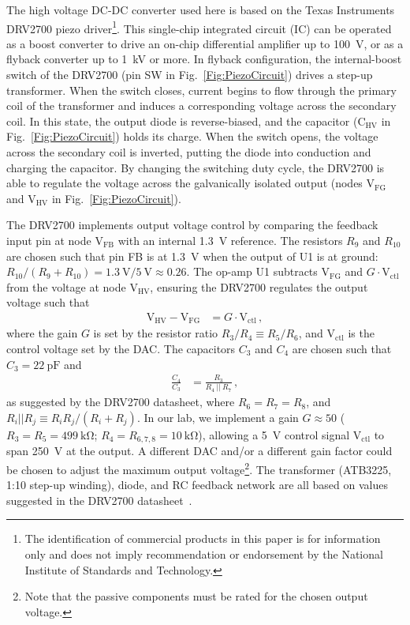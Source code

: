 \documentclass[aip,rsi,reprint]{revtex4-1} %
\begin{document}
The high voltage DC-DC converter used here is based on the Texas Instruments DRV2700 piezo driver\footnote{The identification of commercial products in this paper is for information only and does not imply recommendation or endorsement by the National Institute of Standards and Technology.}.
This single-chip integrated circuit (IC) can be operated as a boost converter to drive an on-chip differential amplifier up to \SI{100}{\volt}, or as a flyback converter up to \SI{1}{\kilo\volt} or more.
In flyback configuration, the internal-boost switch of the DRV2700 (pin SW in Fig.~\ref{Fig:PiezoCircuit}) drives a step-up transformer.
When the switch closes, current begins to flow through the primary coil of the transformer and induces a corresponding voltage across the secondary coil.
In this state, the output diode is reverse-biased, and the capacitor ($\text{C}_{\text{HV}}$ in Fig.~\ref{Fig:PiezoCircuit}) holds its charge.
When the switch opens, the voltage across the secondary coil is inverted, putting the diode into conduction and charging the capacitor.
By changing the switching duty cycle, the DRV2700 is able to regulate the voltage across the galvanically isolated output (nodes $\text{V}_\text{FG}$ and $\text{V}_\text{HV}$ in Fig.~\ref{Fig:PiezoCircuit}).

The DRV2700 implements output voltage control by comparing the feedback input pin at node $\text{V}_\text{FB}$ with an internal \SI{1.3}{\volt} reference.
The resistors $R_9$ and $R_{10}$ are chosen such that pin FB is at \SI{1.3}{\volt} when the output of U1 is at ground: $R_{10}/(R_9+R_{10}) = \SI{1.3}{\volt}/\SI{5}{\volt} \approx \num{0.26}$.
The op-amp U1 subtracts $\text{V}_\text{FG}$ and $G\cdot \text{V}_\text{ctl}$ from the voltage at node $\text{V}_\text{HV}$, ensuring the DRV2700 regulates the output voltage such that
\begin{align}
\label{Eq:U1Output}
\text{V}_\text{HV} - \text{V}_{\text{FG}} &= G\cdot \text{V}_{\text{ctl}}\,,
\end{align}
where the gain $G$ is set by the resistor ratio $R_3/R_4 \equiv R_5/R_6$, and $\text{V}_\text{ctl}$ is the control voltage set by the DAC.
The capacitors $C_3$ and $C_4$ are chosen such that $C_3 = \SI{22}{\pico\farad}$ and
\begin{align}
\frac{C_4}{C_3} &= \frac{R_3}{R_4~||~R_7}\,,
\end{align}
as suggested by the DRV2700 datasheet\cite{DRV2700Datasheet}, where $R_6 = R_7 = R_8$, and $R_i||R_j \equiv R_i R_j/(R_i + R_j)$.
In our lab, we implement a gain $G\approx 50$ ($R_3 = R_5 = \SI{499}{\kilo\ohm}$; $R_4 = R_{6,7,8} = \SI{10}{\kilo\ohm}$), allowing a \SI{5}{\volt} control signal $\text{V}_\text{ctl}$ to span \SI{250}{\volt} at the output. 
A different DAC and/or a different gain factor could be chosen to adjust the maximum output voltage\footnote{Note that the passive components must be rated for the chosen output voltage.}.
The transformer (ATB3225, 1:10 step-up winding), diode, and RC feedback network are all based on values suggested in the DRV2700 datasheet~\cite{DRV2700Datasheet,DRV2700EVMUserGuide}.
\end{document}
